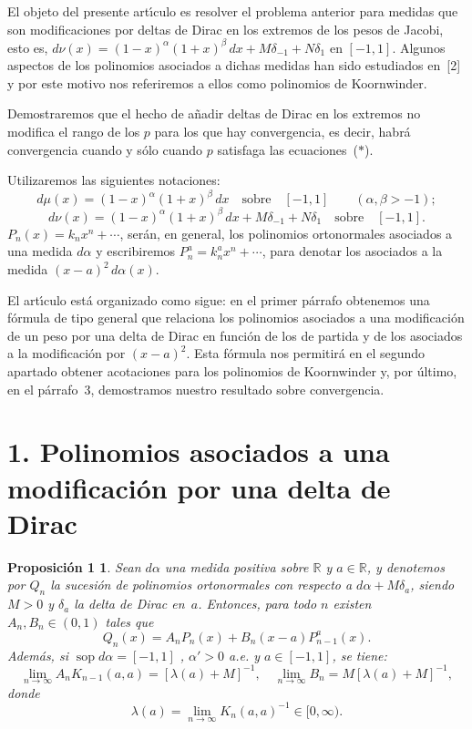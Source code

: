 \documentclass[a4paper,12pt]{article}
\theoremstyle{plain}
\newtheorem*{propoUno}{Proposici\'on 1}
\theoremstyle{definition}
\newcommand{\parrafo}[1]{\section*{\large #1}}
\newcommand{\sop}{\operatorname{sop}}
\newcommand{\R}{\mathbb{R}}
\begin{document}
El objeto del presente art\'{\i}culo es resolver el problema anterior
para medidas que son modificaciones por deltas de Dirac en los
extremos de los pesos de Jacobi, esto es,
$d\nu(x) = (1-x)^{\alpha}(1+x)^{\beta}\,dx
+ M\delta_{-1} + N\delta_{1}$ en $[-1,1]$. Algunos aspectos
de los polinomios asociados a dichas medidas han sido estudiados
en~[2] y por este motivo nos referiremos a ellos como polinomios
de Koornwinder.

Demostraremos que el hecho de a\~nadir deltas de Dirac en los
extremos no modifica el rango de los $p$ para los que hay convergencia,
es decir, habr\'a convergencia cuando y s\'olo cuando $p$ satisfaga
las ecuaciones~($*$).

Utilizaremos las siguientes notaciones:
$$
d\mu(x) = (1-x)^{\alpha}(1+x)^{\beta}\,dx
\quad\text{sobre}\quad [-1,1] \qquad(\alpha,\beta > -1);
$$
$$
d\nu(x) = (1-x)^{\alpha}(1+x)^{\beta}\,dx + M\delta_{-1} + N\delta_{1}
\quad\text{sobre}\quad [-1,1].
$$
$P_{n}(x) = k_{n}x^{n} + \cdots$, ser\'an, en general,
los polinomios ortonormales asociados a una medida $d\alpha$
y escribiremos $P_{n}^{a} = k_{n}^{a} x^{n} + \cdots$,
para denotar los asociados a la medida $(x-a)^{2}\,d\alpha(x)$.

El art\'{\i}culo est\'a organizado como sigue: en el primer p\'arrafo
obtenemos una f\'ormula de tipo general que relaciona los polinomios
asociados a una modificaci\'on de un peso por una delta de Dirac
en funci\'on de los de partida y de los asociados a la modificaci\'on
por $(x-a)^{2}$. Esta f\'ormula nos permitir\'a en el segundo apartado
obtener acotaciones para los polinomios de Koornwinder y, por
\'ultimo, en el p\'arrafo~3, demostramos nuestro resultado sobre
convergencia.

\parrafo{1. Polinomios asociados a una modificaci\'on por una
delta de Dirac}

\begin{propoUno}
Sean $d\alpha$ una medida positiva sobre $\R$ y $a \in \R$,
y denotemos por $Q_{n}$ la sucesi\'on de polinomios
ortonormales con respecto a $d\alpha + M\delta_{a}$,
siendo $M > 0$ y $\delta_{a}$ la delta de Dirac en~$a$. Entonces,
para todo $n$ existen $A_{n}, B_{n} \in (0,1)$ tales que
$$
Q_{n}(x) = A_{n}P_{n}(x) + B_{n}(x-a)P_{n-1}^{a}(x).
$$
Adem\'as, si $\sop d\alpha = [-1,1]$ , $\alpha' > 0$
a.e. y $a \in [-1,1]$, se tiene:
$$
\lim_{n\to\infty} A_{n}K_{n-1}(a,a) = [\lambda(a) + M]^{-1},
\quad \lim_{n\to\infty} B_{n} = M [\lambda(a) + M]^{-1},
$$
donde
$$
\lambda(a) = \lim_{n\to\infty} K_{n}(a,a)^{-1} \in [0,\infty).
$$
\end{propoUno}
\end{document}

